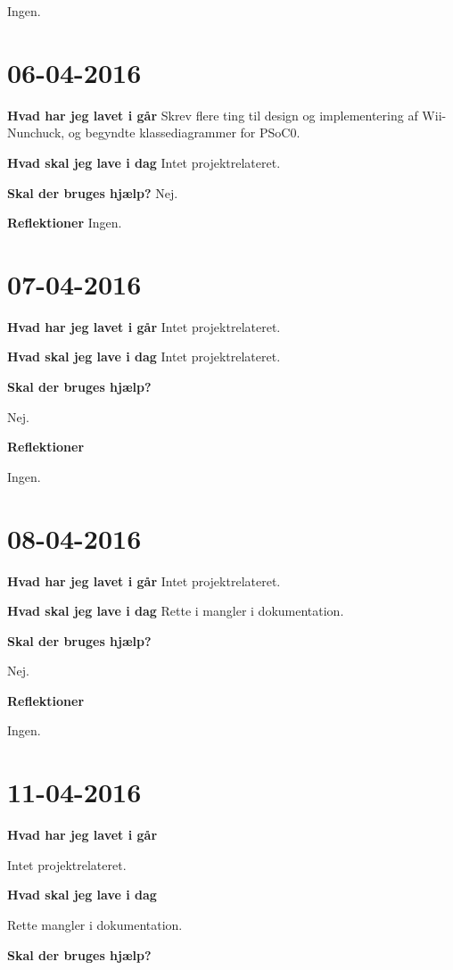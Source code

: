 \documentclass{article}
\begin{document}
	Ingen.
	
	\section{06-04-2016}
	
	\textbf{Hvad har jeg lavet i går}
	Skrev flere ting til design og implementering af Wii-Nunchuck, og begyndte klassediagrammer for PSoC0.
	
	\textbf{Hvad skal jeg lave i dag}
	Intet projektrelateret.
	
	\textbf{Skal der bruges hjælp?}
	Nej.
	
	\textbf{Reflektioner}
	Ingen.
	
	\section{07-04-2016}
	
	\textbf{Hvad har jeg lavet i går}
	Intet projektrelateret.
	
	\textbf{Hvad skal jeg lave i dag}
	Intet projektrelateret.
	
	\textbf{Skal der bruges hjælp?}
	
	Nej.
	
	\textbf{Reflektioner}
	
	Ingen.
	
	\section{08-04-2016}
	
	\textbf{Hvad har jeg lavet i går}
	Intet projektrelateret.
	
	\textbf{Hvad skal jeg lave i dag}
	Rette i mangler i dokumentation. 
	
	\textbf{Skal der bruges hjælp?}
	
	Nej.
	
	\textbf{Reflektioner}
	
	Ingen.
	
	\section{11-04-2016}
	\textbf{Hvad har jeg lavet i går}
	
	Intet projektrelateret.
	
	\textbf{Hvad skal jeg lave i dag}
	
	Rette mangler i dokumentation. 
	
	\textbf{Skal der bruges hjælp?}
	
\end{document}
